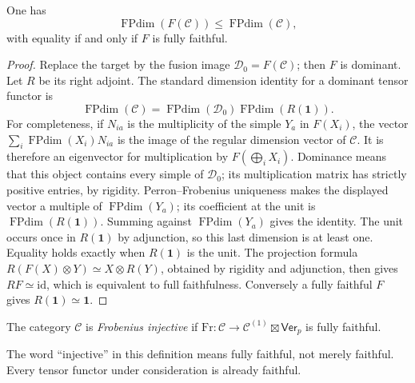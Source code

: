 \begin{lemma}\label{lec21-image-dimension}
One has
\[
 \operatorname{FPdim}(F(\mathcal C))
 \leq\operatorname{FPdim}(\mathcal C),
\]
with equality if and only if $F$ is fully faithful.
\end{lemma}
\begin{proof}
Replace the target by the fusion image $\mathcal D_0=F(\mathcal C)$;
then $F$ is dominant. Let $R$ be its right adjoint. The standard dimension
identity for a dominant tensor functor is
\[
 \operatorname{FPdim}(\mathcal C)
 =\operatorname{FPdim}(\mathcal D_0)
   \operatorname{FPdim}(R(\mathbf1)).
\]
For completeness, if $N_{ia}$ is the multiplicity of the simple $Y_a$ in
$F(X_i)$, the vector $\sum_i\operatorname{FPdim}(X_i)N_{ia}$ is the
image of the regular dimension vector of $\mathcal C$. It is therefore
an eigenvector for multiplication by $F(\bigoplus_iX_i)$.
Dominance means that this object contains every simple of $\mathcal D_0$;
its multiplication matrix has strictly positive entries, by rigidity.
Perron--Frobenius uniqueness makes the displayed vector a multiple of
$\operatorname{FPdim}(Y_a)$; its coefficient at the unit is
$\operatorname{FPdim}(R(\mathbf1))$. Summing against
$\operatorname{FPdim}(Y_a)$ gives the identity.
The unit occurs once in $R(\mathbf1)$ by adjunction, so this last
dimension is at least one. Equality holds exactly when $R(\mathbf1)$ is
the unit. The projection formula
$R(F(X)\otimes Y)\simeq X\otimes R(Y)$, obtained by rigidity and
adjunction, then gives $RF\simeq\mathrm{id}$, which is equivalent to
full faithfulness. Conversely a fully faithful $F$ gives
$R(\mathbf1)\simeq\mathbf1$.
\end{proof}

\begin{definition}
The category $\mathcal C$ is \emph{Frobenius injective} if
$\mathrm{Fr}:\mathcal C\to\mathcal C^{(1)}\boxtimes\mathsf{Ver}_p$ is
fully faithful.
\end{definition}
The word ``injective'' in this definition means fully faithful, not merely
faithful. Every tensor functor under consideration is already faithful.


